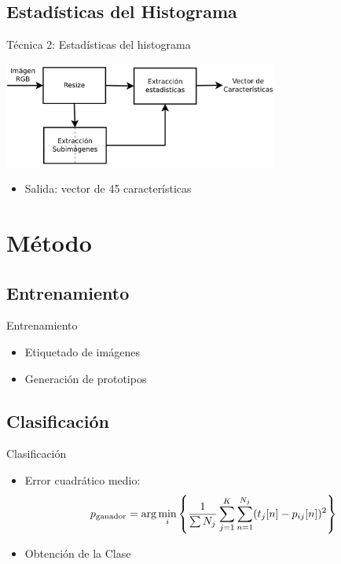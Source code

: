 \documentclass[spanish]{beamer}
\begin{document}
\subsection{Estadísticas del Histograma}
\begin{frame}{Técnica 2: Estadísticas del histograma}
 \begin{center}
   \includegraphics[width=9cm]{../diagramas/procesoestadisticas}
 \end{center}
 \begin{itemize}
 \item Salida: vector de 45 características
 \end{itemize}
\end{frame}
%
\section{Método}
%
\subsection{Entrenamiento}
\begin{frame}{Entrenamiento}
  \begin{itemize}
  \item Etiquetado de imágenes
  \item Generación de prototipos
  \end{itemize}
\end{frame}
%
\subsection{Clasificación}
\begin{frame}{Clasificación}
  \begin{itemize}
  \item Error cuadrático medio:
\begin{equation}
  p_{\textrm{ganador}}=\arg \min_i\left\{ \frac{1}{\sum N_j}
                \sum_{j=1}^K\sum_{n=1}^{N_j}(t_j[n]-p_{ij}[n])^2\right\}
\end{equation}
\item Obtención de la Clase
  \end{itemize}
\end{frame}
%
\end{document}
